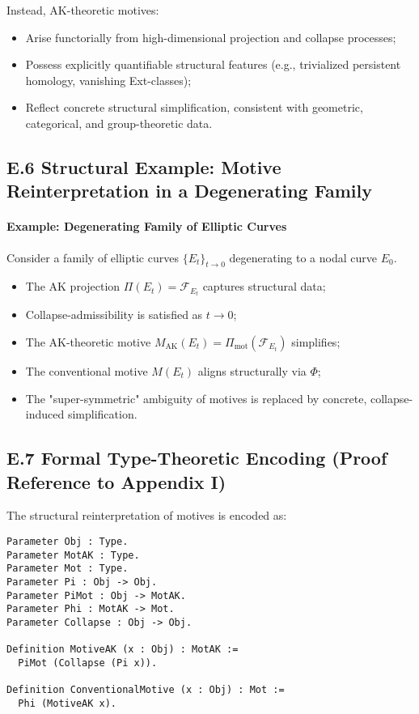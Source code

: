 \documentclass[11pt]{article}
\begin{document}
Instead, AK-theoretic motives:

\begin{itemize}
    \item Arise functorially from high-dimensional projection and collapse processes;
    \item Possess explicitly quantifiable structural features (e.g., trivialized persistent homology, vanishing Ext-classes);
    \item Reflect concrete structural simplification, consistent with geometric, categorical, and group-theoretic data.
\end{itemize}

\subsection*{E.6 Structural Example: Motive Reinterpretation in a Degenerating Family}

\paragraph{Example: Degenerating Family of Elliptic Curves}

Consider a family of elliptic curves $\{E_t\}_{t \to 0}$ degenerating to a nodal curve $E_0$.

\begin{itemize}
    \item The AK projection $\Pi(E_t) = \mathcal{F}_{E_t}$ captures structural data;
    \item Collapse-admissibility is satisfied as $t \to 0$;
    \item The AK-theoretic motive $M_{\mathrm{AK}}(E_t) = \Pi_{\mathrm{mot}}(\mathcal{F}_{E_t})$ simplifies;
    \item The conventional motive $M(E_t)$ aligns structurally via $\Phi$;
    \item The "super-symmetric" ambiguity of motives is replaced by concrete, collapse-induced simplification.
\end{itemize}

\subsection*{E.7 Formal Type-Theoretic Encoding (Proof Reference to Appendix I)}

The structural reinterpretation of motives is encoded as:

\begin{lstlisting}[language=Coq, caption=Formal Encoding of Motive Reinterpretation]
Parameter Obj : Type.
Parameter MotAK : Type.
Parameter Mot : Type.
Parameter Pi : Obj -> Obj.
Parameter PiMot : Obj -> MotAK.
Parameter Phi : MotAK -> Mot.
Parameter Collapse : Obj -> Obj.

Definition MotiveAK (x : Obj) : MotAK :=
  PiMot (Collapse (Pi x)).

Definition ConventionalMotive (x : Obj) : Mot :=
  Phi (MotiveAK x).
\end{lstlisting}
\end{document}
